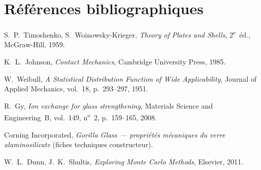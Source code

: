 \documentclass[11pt,a4paper]{article}
\begin{document}
\section{Références bibliographiques}
\small
\begin{enumerate}[label={[\arabic*]},leftmargin=2.2em,itemsep=1pt]
  \item S.~P.~Timoshenko, S.~Woinowsky-Krieger, \textit{Theory of Plates and
        Shells}, 2\textsuperscript{e}~éd., McGraw-Hill, 1959.
  \item K.~L.~Johnson, \textit{Contact Mechanics}, Cambridge University Press,
        1985.
  \item W.~Weibull, \textit{A Statistical Distribution Function of Wide
        Applicability}, Journal of Applied Mechanics, vol.~18, p.~293--297, 1951.
  \item R.~Gy, \textit{Ion exchange for glass strengthening}, Materials Science
        and Engineering~B, vol.~149, n\textsuperscript{o}~2, p.~159--165, 2008.
  \item Corning Incorporated, \textit{Gorilla Glass --- propriétés mécaniques du
        verre aluminosilicate} (fiches techniques constructeur).
  \item W.~L.~Dunn, J.~K.~Shultis, \textit{Exploring Monte Carlo Methods},
        Elsevier, 2011.
\end{enumerate}
\end{document}
